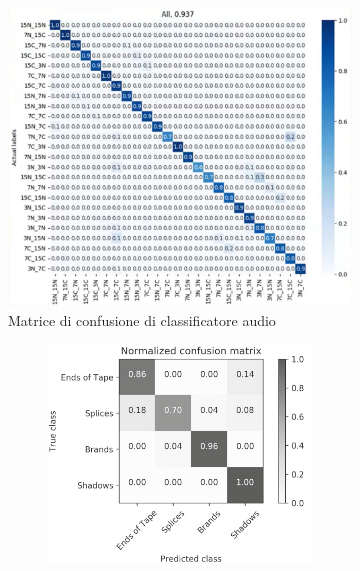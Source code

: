 \begin{figure}[h]
    \begin{minipage}{\textwidth}
        \centering
        \begin{subfigure}{0.8\textwidth}
            \centering
            \includegraphics[width=\textwidth]{img/confusion-matrix-audio-classification.png}
            \caption{Matrice di confusione di classificatore audio \cite[min. 35:10]{mpaistandardsMPAIPresentsContextbased2023}}
            \label{fig:confusion-matrix-audio-classification}
        \end{subfigure}
        \par\bigskip
        \begin{subfigure}{0.9\textwidth}
            \centering
            \begin{subfigure}{0.45\textwidth}
                \centering
                \includegraphics[width=\textwidth]{img/confusion-matrix-video-classification-7dot5ips-tape.png}

\end{subfigure}
\end{subfigure}
\end{minipage}
\end{figure}
